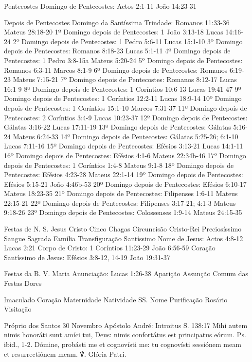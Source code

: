 Pentecostes
Domingo de Pentecostes:	Actos 2:1-11	João 14:23-31

Depois de Pentecostes
Domingo da Santíssima Trindade:	Romanos 11:33-36	Mateus 28:18-20
1º Domingo depois de Pentecostes:	1 João 3:13-18	Lucas 14:16-24
2º Domingo depois de Pentecostes:	1 Pedro 5:6-11	Lucas 15:1-10
3º Domingo depois de Pentecostes: Romanos 8:18-23	Lucas 5:1-11
4º Domingo depois de Pentecostes:	1 Pedro 3:8-15a	Mateus 5:20-24
5º Domingo depois de Pentecostes:	Romanos 6:3-11	Marcos 8:1-9
6º Domingo depois de Pentecostes:	Romanos 6:19-23	Mateus 7:15-21
7º Domingo depois de Pentecostes: Romanos 8:12-17	Lucas 16:1-9
8º Domingo depois de Pentecostes:	1 Coríntios 10:6-13	Lucas 19:41-47
9º Domingo depois de Pentecostes:	1 Coríntios 12:2-11	Lucas 18:9-14
10º Domingo depois de Pentecostes:	1 Coríntios 15:1-10	Marcos 7:31-37
11º Domingo depois de Pentecostes:	2 Coríntios 3:4-9	Lucas 10:23-37
12º Domingo depois de Pentecostes:	Gálatas 3:16-22	Lucas 17:11-19
13º Domingo depois de Pentecostes:	Gálatas 5:16-24	Mateus 6:24-33
14º Domingo depois de Pentecostes:	Gálatas 5:25-26; 6:1-10	Lucas 7:11-16
15º Domingo depois de Pentecostes:	Efésios 3:13-21	Lucas 14:1-11
16º Domingo depois de Pentecostes:	Efésios 4:1-6	Mateus 22:34b-46
17º Domingo depois de Pentecostes:	1 Coríntios 1:4-8	Mateus 9:1-8
18º Domingo depois de Pentecostes:	Efésios 4:23-28	Mateus 22:1-14
19º Domingo depois de Pentecostes:	Efésios 5:15-21	João 4:46b-53
20º Domingo depois de Pentecostes: Efésios 6:10-17	Mateus 18:23-35
21º Domingo depois de Pentecostes:	Filipenses 1:6-11	Mateus 22:15-21
22º Domingo depois de Pentecostes:	Filipenses 3:17-21; 4:1-3	Mateus 9:18-26
23º Domingo depois de Pentecostes:	Colossenses 1:9-14	Mateus 24:15-35

Festas de N. S. Jesus Cristo
Cinco Chagas
Circuncisão
Cristo-Rei
Preciosíssimo Sangue
Sagrada Família
Transfiguração
Santíssimo Nome de Jesus:	Actos 4:8-12	Lucas 2:21
Corpo de Cristo:	1 Coríntios 11:23-29	João 6:56-59
Coração Santíssimo de Jesus: Efésios 3:8-12, 14-19 João 19:31-37

Festas da B. V. Maria
Anunciação: Lucas 1:26-38
Aparição
Assunção
Comum das Festas
Dores

Imaculado Coração
Maternidade
Natividade
SS. Nome
Purificação
Rosário
Visitação

Próprio dos Santos
30 Novembro
Apóstolo André:
Introitus S. 138:17
Mihi autem nimis honoráti sunt amíci tui, Deus: nimis confortátus est principatus eórum. Ps. ibid., 1-2. Dómine, probásti me et cognovísti me: tu cognovísti sessiónem meam et resurrectiónem meam. ℣. Glória Patri.

